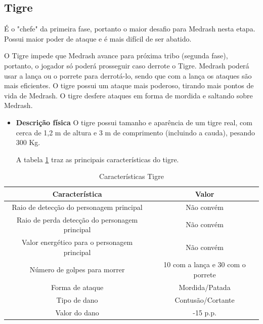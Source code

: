 \subsection{Tigre}
É o "chefe" da primeira fase, portanto o maior desafio para Medrash nesta etapa. Possui maior poder de ataque e é mais difícil de ser abatido.


O Tigre impede que Medrash avance para próxima tribo (segunda fase), portanto, o jogador só poderá prosseguir caso derrote o Tigre. Medrash poderá usar a lança ou o porrete para derrotá-lo, sendo que com a lança os ataques são mais eficientes. O tigre possui um ataque mais poderoso, tirando mais pontos de vida de Medrash. O tigre desfere ataques em forma de mordida e saltando sobre Medrash.
\begin{itemize}
\item {\bf Descrição física}
O tigre possui tamanho e aparência de um tigre real, com cerca de 1,2 m de altura e 3 m de comprimento (incluindo a cauda), pesando 300 Kg.

A tabela \ref{table:tigre} traz as principais características do tigre.
\end{itemize}
\begin{table}[H]
\begin{center}
\begin{tabular}{|c|c|}
\hline 
\textbf{Característica} & \textbf{Valor} \\ 
\hline 
Raio de detecção do personagem principal & Não convém \\ 
\hline 
Raio de perda detecção do personagem principal & Não convém \\ 
\hline 
Valor energético para o personagem principal & Não convém \\ 
\hline 
Número de golpes para morrer & 10 com a lança e 30 com o porrete \\ 
\hline 
Forma de ataque & Mordida/Patada\\ 
\hline 
Tipo de dano &  Contusão/Cortante \\ 
\hline 
Valor do dano & -15 p.p. \\ 
\hline 
\end{tabular} 
\end{center}
\caption{Características Tigre}
\label{table:tigre}
\end{table}
